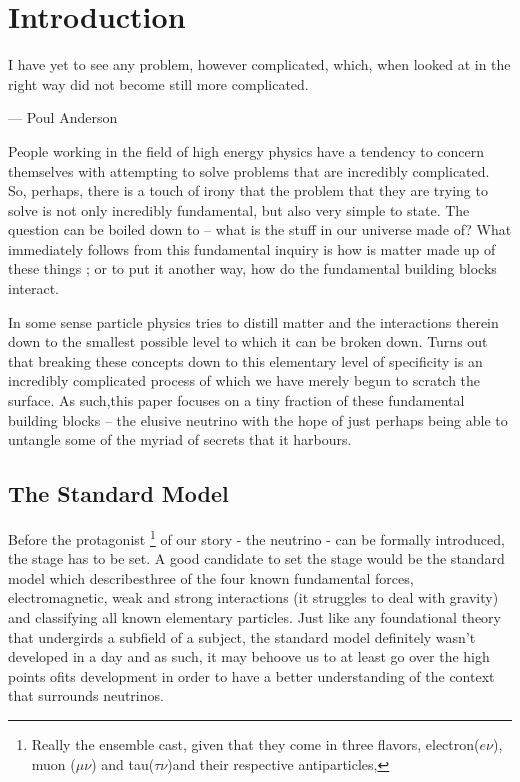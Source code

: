 \section{Introduction}

I have yet to see any problem, however complicated, which, when looked at in the right way did not become still more complicated.

\begin{flushright}--- Poul Anderson\end{flushright}

  People working in the field of high energy physics have a tendency to concern themselves with attempting to solve problems that are incredibly complicated.
  So, perhaps, there is a touch of irony that the problem that they are trying to solve is not only incredibly fundamental, but also very simple to state.
  The question can be boiled down to -- what is the stuff in our universe made of?
  What immediately follows from this fundamental inquiry is how is matter made up of these things ; or to put it another way, how do the fundamental building blocks interact.

  In some sense particle physics tries to distill matter and the interactions therein down to the smallest possible level to which it can be broken down.
  Turns out that breaking these concepts down to this elementary level of specificity is an incredibly complicated process of which we have merely begun to scratch the surface.
  As such,this paper focuses on a tiny fraction of these fundamental building blocks -- the elusive neutrino with the hope of just perhaps being able to untangle some of the myriad of secrets that it harbours.

  \subsection{The Standard Model}

  Before the protagonist
  \footnote{Really the ensemble cast, given that they come in three flavors, electron($e\nu$), muon ($\mu \nu$) and tau($\tau \nu$)and their respective antiparticles,}
  of our story - the neutrino - can be formally introduced, the stage has to be set.
  A good candidate to set the stage would be the standard model which describesthree of the four known fundamental forces, electromagnetic, weak and strong interactions (it struggles to deal with  gravity) and classifying all known elementary particles.
  Just like any foundational theory that undergirds a subfield of a subject, the standard model definitely wasn't developed in a day and as such, it may behoove us to at least go over the high points ofits development in order to have a better understanding of the context that surrounds neutrinos.

